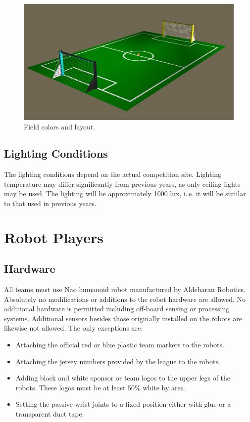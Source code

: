 \documentclass[12pt]{article}
\newcommand{\ie}{\mbox{i.\,e.}\xspace}
\begin{document}
\begin{figure}[t]
\centerline{\includegraphics[width=\columnwidth]{figs/Nao2008Field-View.png}}
\caption{Field colors and layout.}
\label{fig:field_color}
\end{figure}


\subsection{Lighting Conditions}
The lighting conditions depend on the actual competition site.
Lighting temperature may differ significantly from previous years, as
only ceiling lights may be used. The lighting will be approximately
1000 lux, \ie it will be similar to that used in previous years.

\section{Robot Players}

\subsection{Hardware}

All teams must use Nao humanoid robot manufactured by Aldebaran Robotics. Absolutely no
modifications or additions to the robot hardware are allowed. No
additional hardware is permitted including off-board sensing or
processing systems. Additional sensors besides those originally
installed on the robots are likewise not allowed. The only
exceptions are:

\begin{itemize}
\item Attaching the official red or blue plastic team markers to the robots.
\item Attaching the jersey numbers provided by the league to the robots.
\item Adding black and white sponsor or team logos to the upper legs of the
robots. These logos must be at least 50\% white by area.
\item Setting the passive wrist joints to a fixed position either with glue or a transparent duct tape. 
\end{itemize}
\end{document}
